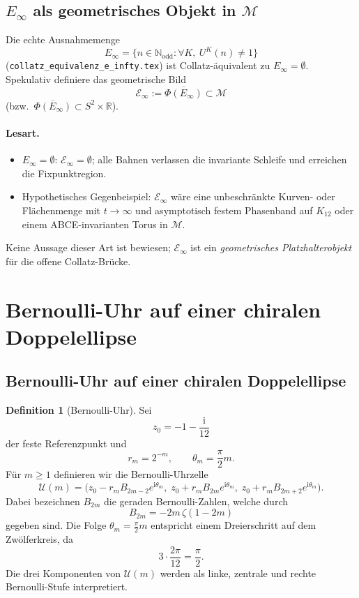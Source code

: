 \documentclass[11pt,a4paper]{article}
\theoremstyle{definition}
\newtheorem{definition}{Definition}[section]
\theoremstyle{remark}
\newcommand{\Nodd}{\mathbb{N}_{\mathrm{odd}}}
\newcommand{\R}{\mathbb{R}}
\newcommand{\Einf}{E_{\infty}}
\begin{document}
\subsection{\texorpdfstring{$\Einf$}{E\_infty} als geometrisches Objekt in \texorpdfstring{$\mathcal{M}$}{M}}

Die echte Ausnahmemenge
\[
\Einf=\{n\in\Nodd:\forall K,\ U^K(n)\neq 1\}
\]
(\texttt{collatz\_equivalenz\_e\_infty.tex}) ist Collatz-äquivalent zu
$\Einf=\emptyset$. Spekulativ definiere das geometrische Bild
\[
\mathcal{E}_\infty:=\overline{\Phi(\Einf)}\subset\mathcal{M}
\]
(bzw.\ $\overline{\Phi(\Einf)}\subset S^2\times\R$).
\paragraph{Lesart.}
\begin{itemize}[nosep]
  \item $\Einf=\emptyset$: $\mathcal{E}_\infty=\emptyset$; alle Bahnen
    verlassen die invariante Schleife und erreichen die Fixpunktregion.
  \item Hypothetisches Gegenbeispiel: $\mathcal{E}_\infty$ wäre eine
    unbeschränkte Kurven- oder Flächenmenge mit $t\to\infty$ und
    asymptotisch festem Phasenband auf $K_{12}$ oder einem
    ABCE-invarianten Torus in $\mathcal{M}$.
\end{itemize}
Keine Aussage dieser Art ist bewiesen; $\mathcal{E}_\infty$ ist ein
\emph{geometrisches Platzhalterobjekt} für die offene Collatz-Brücke.

\section{Bernoulli-Uhr auf einer chiralen Doppelellipse}
\label{sec:bernoulli-uhr}

\subsection{Bernoulli-Uhr auf einer chiralen Doppelellipse}

\begin{definition}[Bernoulli-Uhr]
Sei
\[
z_0=-1-\frac{\mathrm{i}}{12}
\]
der feste Referenzpunkt und
\[
r_m=2^{-m},\qquad \theta_m=\frac{\pi}{2}m.
\]
Für $m\ge 1$ definieren wir die Bernoulli-Uhrzelle
\[
\mathcal{U}(m)
=
\Big(
z_0-r_m B_{2m-2}e^{\mathrm{i}\theta_m},\;
z_0+r_m B_{2m}e^{\mathrm{i}\theta_m},\;
z_0+r_m B_{2m+2}e^{\mathrm{i}\theta_m}
\Big).
\]
Dabei bezeichnen $B_{2m}$ die geraden Bernoulli-Zahlen, welche durch
\[
B_{2m}=-2m\,\zeta(1-2m)
\]
gegeben sind.
Die Folge $\theta_m=\frac{\pi}{2}m$ entspricht einem Dreierschritt auf dem
Zwölferkreis, da
\[
3\cdot\frac{2\pi}{12}=\frac{\pi}{2}.
\]
Die drei Komponenten von $\mathcal{U}(m)$ werden als linke, zentrale und
rechte Bernoulli-Stufe interpretiert.
\end{definition}
\end{document}
